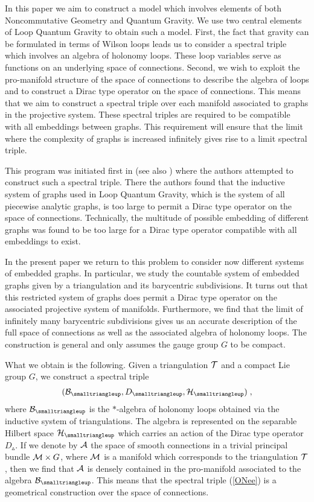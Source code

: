 \documentclass[12pt]{article}
\newcommand{\ba}{\begin{eqnarray}}
\newcommand{\ea}{\end{eqnarray}}
\def\ca{{\cal A}}
\def\cb{{\cal B}}
\def\ch{{\cal H}}
\def\cm{{\cal M}}
\def\ct{{\cal T}}
\begin{document}
In this paper we aim to construct a model which involves elements of both Noncommutative Geometry and Quantum Gravity. We use two central elements of Loop Quantum Gravity to obtain such a model. First, the fact that gravity can be formulated in terms of Wilson loops leads us to consider a spectral triple which involves an algebra of holonomy loops. These loop variables serve as functions on an underlying space of connections. Second, we wish to exploit the pro-manifold structure of the space of connections to describe the algebra of loops and to construct a Dirac type operator on the space of connections. This means that we aim to construct a spectral triple over each manifold associated to graphs in the projective system. These spectral triples are required to be compatible with all embeddings between graphs. This requirement will ensure that the limit where the complexity of graphs is increased infinitely gives rise to a limit spectral triple.

This program was initiated first in \cite{Aastrup:2005yk} (see also \cite{Aastrup:2006ib}) where the authors attempted to construct such a spectral triple. There the authors found that the inductive system of graphs used in Loop Quantum Gravity, which is the system of all piecewise analytic graphs, is too large to permit a Dirac type operator on the space of connections. Technically, the multitude of possible embedding of different graphs was found to be too large for a Dirac type operator compatible with all embeddings to exist.


In the present paper we return to this problem to consider now different systems of embedded graphs. In particular, we study the countable system of embedded graphs given by a triangulation and its barycentric subdivisions. It turns out that this restricted system of graphs does permit a Dirac type operator on the associated projective system of manifolds. Furthermore, we find that the limit of infinitely many barycentric subdivisions gives us an accurate description of the full space of connections as well as the associated algebra of holonomy loops. The construction is general and only assumes the gauge group $G$ to be compact.




What we obtain is the following. Given a triangulation $\ct$ and a compact Lie group $G$, we construct a spectral triple 
\ba 
(\cb_{\smalltriangleup},D_{\smalltriangleup},\ch_\smalltriangleup)\;,
\label{ONee}
\ea
where $\cb_{\smalltriangleup}$ is the $\ast$-algebra of holonomy loops obtained via the inductive system of triangulations. The algebra is represented on the separable Hilbert space $\ch_\smalltriangleup$ which carries an action of the Dirac type operator $D_{\smalltriangleup}$. 
If we denote by $\ca$ the space of smooth connections in a trivial principal bundle $\cm\times G$, where $\cm$ is a manifold which corresponds to the triangulation $\ct$, then we find that $\ca$ is densely contained in the pro-manifold associated to the algebra $\cb_{\smalltriangleup}$. This means that the spectral triple (\ref{ONee}) is a geometrical construction over the space of connections.
\end{document}
